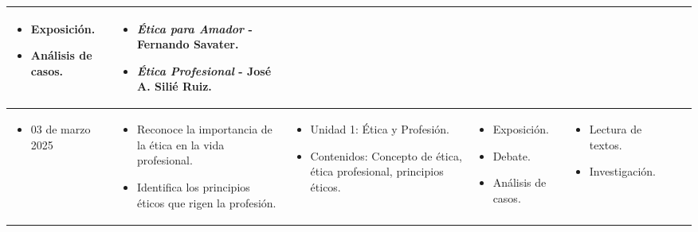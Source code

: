 \begin{landscape}
\begin{xltabular}{\linewidth}{@{}X@{}X@{}X@{}X@{}X@{}X@{}X@{}}
\begin{itemize}
            \item Exposición.
            \item Análisis de casos.
        \end{itemize}                             &
        \begin{itemize}
            \item \textit{Ética para Amador} - Fernando Savater.
            \item \textit{Ética Profesional} - José A. Silié Ruiz.
        \end{itemize}                                                                                                                                                                                                                                  \\
        \midrule
        \begin{itemize}[label={}, left=0pt .. 0pt]
            \item 03 de marzo 2025
        \end{itemize}                                                          &
        \begin{itemize}
            \item Reconoce la importancia de la ética en la vida profesional.
            \item Identifica los principios éticos que rigen la profesión.
        \end{itemize}          &
        \begin{itemize}
            \item Unidad 1: Ética y Profesión.
            \item Contenidos: Concepto de ética, ética profesional, principios éticos.
        \end{itemize} &
        \begin{itemize}
            \item Exposición.
            \item Debate.
            \item Análisis de casos.
        \end{itemize}                             &
        \begin{itemize}
            \item Lectura de textos.
            \item Investigación.
        \end{itemize}                             &

\end{xltabular}
\end{landscape}
